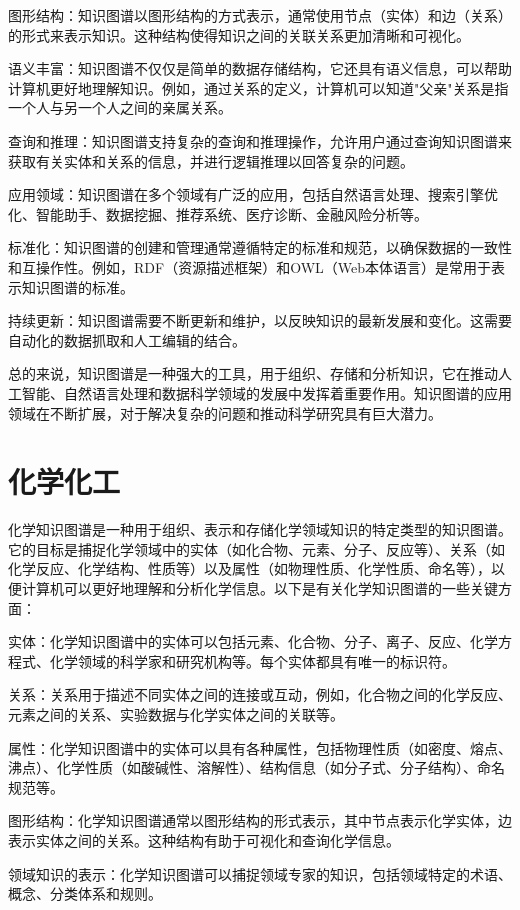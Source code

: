 图形结构：知识图谱以图形结构的方式表示，通常使用节点（实体）和边（关系）的形式来表示知识。这种结构使得知识之间的关联关系更加清晰和可视化。

语义丰富：知识图谱不仅仅是简单的数据存储结构，它还具有语义信息，可以帮助计算机更好地理解知识。例如，通过关系的定义，计算机可以知道"父亲"关系是指一个人与另一个人之间的亲属关系。

查询和推理：知识图谱支持复杂的查询和推理操作，允许用户通过查询知识图谱来获取有关实体和关系的信息，并进行逻辑推理以回答复杂的问题。

应用领域：知识图谱在多个领域有广泛的应用，包括自然语言处理、搜索引擎优化、智能助手、数据挖掘、推荐系统、医疗诊断、金融风险分析等。

标准化：知识图谱的创建和管理通常遵循特定的标准和规范，以确保数据的一致性和互操作性。例如，RDF（资源描述框架）和OWL（Web本体语言）是常用于表示知识图谱的标准。

持续更新：知识图谱需要不断更新和维护，以反映知识的最新发展和变化。这需要自动化的数据抓取和人工编辑的结合。

总的来说，知识图谱是一种强大的工具，用于组织、存储和分析知识，它在推动人工智能、自然语言处理和数据科学领域的发展中发挥着重要作用。知识图谱的应用领域在不断扩展，对于解决复杂的问题和推动科学研究具有巨大潜力。

\section{化学化工}
化学知识图谱是一种用于组织、表示和存储化学领域知识的特定类型的知识图谱。它的目标是捕捉化学领域中的实体（如化合物、元素、分子、反应等）、关系（如化学反应、化学结构、性质等）以及属性（如物理性质、化学性质、命名等），以便计算机可以更好地理解和分析化学信息。以下是有关化学知识图谱的一些关键方面：

实体：化学知识图谱中的实体可以包括元素、化合物、分子、离子、反应、化学方程式、化学领域的科学家和研究机构等。每个实体都具有唯一的标识符。

关系：关系用于描述不同实体之间的连接或互动，例如，化合物之间的化学反应、元素之间的关系、实验数据与化学实体之间的关联等。

属性：化学知识图谱中的实体可以具有各种属性，包括物理性质（如密度、熔点、沸点）、化学性质（如酸碱性、溶解性）、结构信息（如分子式、分子结构）、命名规范等。

图形结构：化学知识图谱通常以图形结构的形式表示，其中节点表示化学实体，边表示实体之间的关系。这种结构有助于可视化和查询化学信息。

领域知识的表示：化学知识图谱可以捕捉领域专家的知识，包括领域特定的术语、概念、分类体系和规则。


